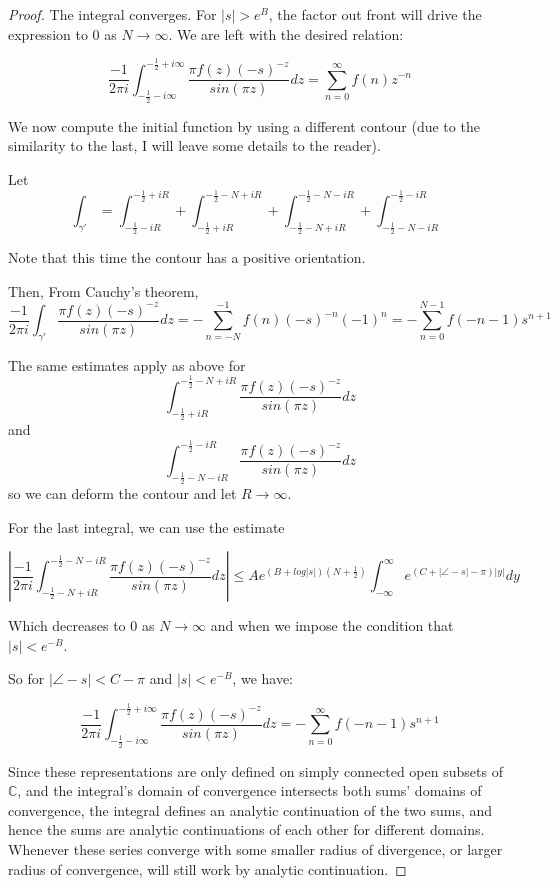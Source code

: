 \documentclass{article}
\begin{document}
\begin{proof}
		The integral converges. For $\left| s \right| > e^B$, the factor out front will drive the expression to 0 as $N \rightarrow \infty$. We are left with the desired relation:
		
		$$ \frac{-1}{2 \pi i} \int_{-\frac{1}{2} - i \infty}^{-\frac{1}{2} + i \infty} \frac{\pi f(z) (-s)^{-z}}{ sin( \pi z ) } dz = \sum_{n=0}^{\infty} f(n) z^{-n} $$
		
		We now compute the initial function by using a different contour (due to the similarity to the last, I will leave some details to the reader). 
		
		Let
		$$ \int_{ \gamma'} = \int_{-\frac{1}{2} - i R }^{ -\frac{1}{2} + i R } + \int_{ -\frac{1}{2} + i R }^{ -\frac{1}{2} - N + i R } + \int_{-\frac{1}{2} - N + i R }^{ -\frac{1}{2} - N - i R } + \int_{-\frac{1}{2} - N - i R}^{ -\frac{1}{2} - i R } $$
		
		Note that this time the contour has a positive orientation.
		
		Then, From Cauchy's theorem, $$ \frac{ -1 }{ 2 \pi i } \int_{\gamma'}  \frac{\pi f(z) (-s)^{-z}}{ sin( \pi z ) } dz = -\sum_{n=-N}^{-1} f(n) (-s)^{-n} (-1)^{n} = -\sum_{n=0}^{N-1} f(-n-1) s^{n+1} $$
		
		The same estimates apply as above for
		$$ \int_{ -\frac{1}{2} + i R }^{ -\frac{1}{2} - N + i R } \frac{\pi f(z) (-s)^{-z}}{ sin( \pi z ) } dz $$ and $$ \int_{-\frac{1}{2} - N - i R}^{ -\frac{1}{2} - i R } \frac{\pi f(z) (-s)^{-z}}{ sin( \pi z ) } dz $$
		so we can deform the contour and let $R \rightarrow \infty$. 
		
		For the last integral, we can use the estimate
		
		$$ \left| \frac{-1}{ 2 \pi i } \int_{-\frac{1}{2} - N + i R }^{ -\frac{1}{2} - N - i R }  \frac{\pi f(z) (-s)^{-z}}{ sin( \pi z ) } dz \right| \leq A e^{(B + log\left| s \right|) (N + \frac{1}{2})} \int_{-\infty}^{\infty} e^{( C + \left| \angle-s \right| - \pi )|y|} dy $$
		
		Which decreases to $0$ as $N \rightarrow \infty $ and when we impose the condition that $|s| < e^{-B}$. 
		
		So for $|\angle-s| < C - \pi$ and $|s| < e^{-B}$, we have:
		
		$$ \frac{-1}{2 \pi i} \int_{-\frac{1}{2} - i \infty}^{ -\frac{1}{2} + i \infty} \frac{\pi f(z) (-s)^{-z}}{ sin( \pi z ) } dz = -\sum_{n=0}^{\infty} f(-n-1) s^{n+1} $$
		
		Since these representations are only defined on simply connected open subsets of $\mathbb{C}$, and the integral's domain of convergence intersects both sums' domains of convergence, the integral defines an analytic continuation of the two sums, and hence the sums are analytic continuations of each other for different domains. Whenever these series converge with some smaller radius of divergence, or larger radius of convergence, will still work by analytic continuation. 
	\end{proof}
\end{document}

